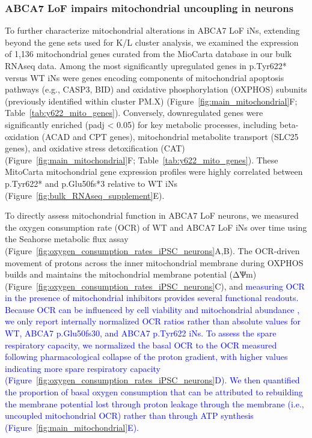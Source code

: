 \subsubsection{ABCA7 LoF impairs mitochondrial uncoupling in neurons}
To further characterize mitochondrial alterations in ABCA7 LoF iNs, extending beyond the gene sets used for K/L cluster analysis, we examined the expression of 1,136 mitochondrial genes curated from the MioCarta database in our bulk RNAseq data. Among the most significantly upregulated genes in p.Tyr622* versus WT iNs were genes encoding components of mitochondrial apoptosis pathways (e.g., CASP3, BID) and oxidative phosphorylation (OXPHOS) subunits (previously identified within cluster PM.X) (Figure~\ref{fig:main_mitochondrial}F; Table~\ref{tab:y622_mito_genes}). Conversely, downregulated genes were significantly enriched (padj < 0.05) for key metabolic processes, including beta-oxidation (ACAD and CPT genes), mitochondrial metabolite transport (SLC25 genes), and oxidative stress detoxification (CAT) (Figure~\ref{fig:main_mitochondrial}F; Table~\ref{tab:y622_mito_genes}). These MitoCarta mitochondrial gene expression profiles were highly correlated between p.Tyr622* and p.Glu50fs*3 relative to WT iNs (Figure~\ref{fig:bulk_RNAseq_supplement}E).

To directly assess mitochondrial function in ABCA7 LoF neurons, we measured the oxygen consumption rate (OCR) of WT and ABCA7 LoF iNs over time using the Seahorse metabolic flux assay (Figure~\ref{fig:oxygen_consumption_rates_iPSC_neurons}A,B). The OCR-driven movement of protons across the inner mitochondrial membrane during OXPHOS builds and maintains the mitochondrial membrane potential (ΔѰm)(Figure~\ref{fig:oxygen_consumption_rates_iPSC_neurons}C), and  \newcommand{\quoteC}{\textcolor{blue}{measuring OCR in the presence of mitochondrial inhibitors provides several functional readouts. Because OCR can be influenced by cell viability and mitochondrial abundance \cite{Divakaruni2014-eq,Gu2021-ms}, we only report internally normalized OCR ratios rather than absolute values \cite{Divakaruni2022-bp} for WT, ABCA7 p.Glu50fs30, and ABCA7 p.Tyr622 iNs. To assess the spare respiratory capacity, we normalized the basal OCR to the OCR measured following pharmacological collapse of the proton gradient, with higher values indicating more spare respiratory capacity \cite{Divakaruni2022-bp} (Figure~\ref{fig:oxygen_consumption_rates_iPSC_neurons}D). We then quantified the proportion of basal oxygen consumption that can be attributed to rebuilding the membrane potential lost through proton leakage through the membrane (i.e., uncoupled mitochondrial OCR) rather than through ATP synthesis \cite{Divakaruni2022-bp} (Figure~\ref{fig:main_mitochondrial}E).\label{quoteC-label}}}
\quoteC


